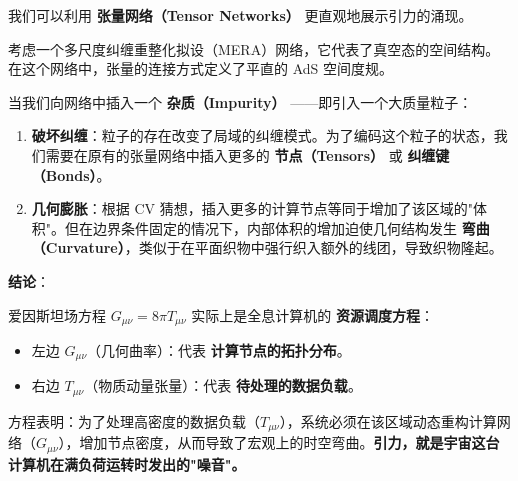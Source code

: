 我们可以利用 \textbf{张量网络（Tensor Networks）} 更直观地展示引力的涌现。

考虑一个多尺度纠缠重整化拟设（MERA）网络，它代表了真空态的空间结构。在这个网络中，张量的连接方式定义了平直的 AdS 空间度规。

当我们向网络中插入一个 \textbf{杂质（Impurity）} ——即引入一个大质量粒子：

\begin{enumerate}
\item \textbf{破坏纠缠}：粒子的存在改变了局域的纠缠模式。为了编码这个粒子的状态，我们需要在原有的张量网络中插入更多的 \textbf{节点（Tensors）} 或 \textbf{纠缠键（Bonds）}。

\item \textbf{几何膨胀}：根据 CV 猜想，插入更多的计算节点等同于增加了该区域的"体积"。但在边界条件固定的情况下，内部体积的增加迫使几何结构发生 \textbf{弯曲（Curvature）}，类似于在平面织物中强行织入额外的线团，导致织物隆起。
\end{enumerate}

\textbf{结论}：

爱因斯坦场方程 $G_{\mu\nu} = 8\pi T_{\mu\nu}$ 实际上是全息计算机的 \textbf{资源调度方程}：

\begin{itemize}
\item 左边 $G_{\mu\nu}$（几何曲率）：代表 \textbf{计算节点的拓扑分布}。

\item 右边 $T_{\mu\nu}$（物质动量张量）：代表 \textbf{待处理的数据负载}。
\end{itemize}

方程表明：为了处理高密度的数据负载（$T_{\mu\nu}$），系统必须在该区域动态重构计算网络（$G_{\mu\nu}$），增加节点密度，从而导致了宏观上的时空弯曲。\textbf{引力，就是宇宙这台计算机在满负荷运转时发出的"噪音"。}
